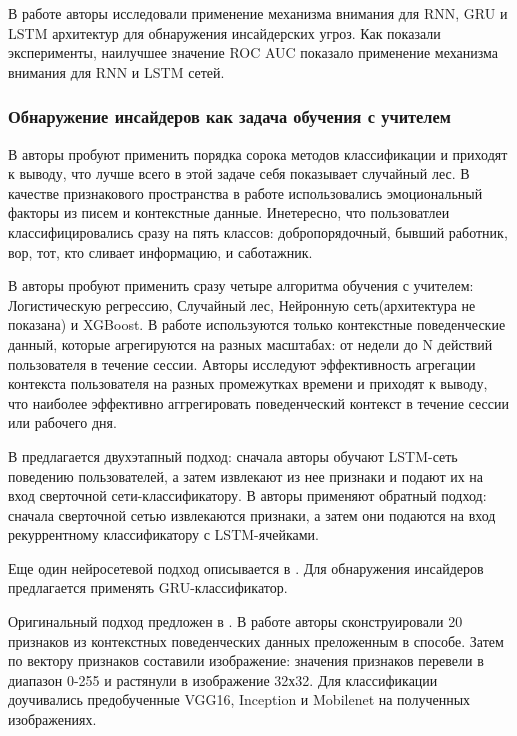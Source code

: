 В работе \cite{attention} авторы исследовали применение механизма внимания для RNN, GRU и LSTM архитектур для обнаружения инсайдерских угроз. Как показали эксперименты, наилучшее значение ROC AUC показало применение механизма внимания для RNN и LSTM сетей.


\subsubsection{Обнаружение инсайдеров как задача обучения с учителем}

В \cite{suites} авторы пробуют применить порядка сорока методов классификации и приходят к выводу, что лучше всего в этой задаче себя показывает случайный лес. В качестве признакового пространства в работе использовались эмоциональный факторы из писем и контекстные данные. Инетересно, что пользоватлеи классифицировались сразу на пять классов: добропорядочный, бывший работник, вор, тот, кто сливает информацию, и саботажник.

В \cite{granual} авторы пробуют применить сразу четыре алгоритма обучения с учителем: Логистическую регрессию, Случайный лес, Нейронную сеть(архитектура не показана) и XGBoost. В работе используются только контекстные поведенческие данный, которые агрегируются на разных масштабах: от недели до N действий пользователя в течение сессии. Авторы исследуют эффективность агрегации контекста пользователя на разных промежутках времени и приходят к выводу, что наиболее эффективно аггрегировать поведенческий контекст в течение сессии или рабочего дня.

В \cite{lstm_cnn} предлагается двухэтапный подход: сначала авторы обучают LSTM-сеть поведению пользователей, а затем извлекают из нее признаки и подают их на вход сверточной сети-классификатору.
В \cite{cnn_lstm} авторы применяют обратный подход: сначала сверточной сетью извлекаются признаки, а затем они подаются на вход рекуррентному классификатору с LSTM-ячейками. 

Еще один нейросетевой подход описывается в \cite{gru}. Для обнаружения инсайдеров предлагается применять GRU-классификатор.

Оригинальный подход предложен в \cite{imagebased}. В работе авторы сконструировали 20 признаков из контекстных поведенческих данных преложенным в \cite{8444978} способе. Затем по вектору признаков составили изображение: значения признаков перевели в диапазон 0-255 и растянули в изображение 32х32. Для классификации доучивались предобученные VGG16, Inception и Mobilenet на полученных изображениях.


